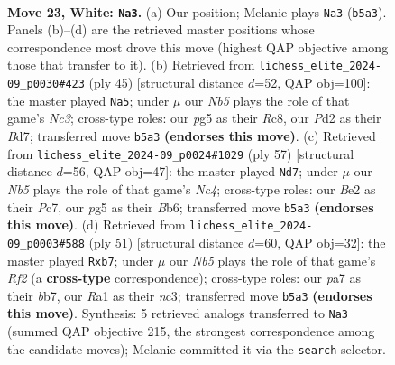 \documentclass[11pt]{article}
\begin{document}
\clearpage

\begin{figure}[p]\centering
\begin{subfigure}{0.46\textwidth}\centering
\resizebox{\linewidth}{!}{%
\newchessgame
\chessboard[
  setfen={r1b3k1/p1pp4/1p5p/1N3pp1/1n6/1P3PP1/P1PPBK1P/R7 w - - 4 23},
  showmover=false,
  pgfstyle=straightmove, color=movearrow, markmove={b5-a3}
]}
\caption{}
\end{subfigure}\hfill
\begin{subfigure}{0.46\textwidth}\centering
\resizebox{\linewidth}{!}{%
\newchessgame
\chessboard[
  setfen={2r3k1/3b1ppp/p1n1p3/1p1pP3/3P1P2/P1N1K3/1P2B1PP/5R2 b - - 1 23},
  showmover=false,
  pgfstyle=straightmove, color=movearrow, markmove={c6-a5}
]}
\caption{}
\end{subfigure}
\\[4pt]
\begin{subfigure}{0.46\textwidth}\centering
\resizebox{\linewidth}{!}{%
\newchessgame
\chessboard[
  setfen={2k5/1pp2Npp/1b3p2/pPn5/P7/2P3P1/r4P1P/3RBK2 b - - 1 29},
  showmover=false,
  pgfstyle=straightmove, color=movearrow, markmove={c5-d7}
]}
\caption{}
\end{subfigure}\hfill
\begin{subfigure}{0.46\textwidth}\centering
\resizebox{\linewidth}{!}{%
\newchessgame
\chessboard[
  setfen={6k1/pB3r1p/1p2pp2/2p5/2Pn1P2/1PN1R1P1/P6P/5K2 b - - 0 26},
  showmover=false,
  pgfstyle=straightmove, color=movearrow, markmove={f7-b7}
]}
\caption{}
\end{subfigure}
\caption{\textbf{Move 23, White: \texttt{Na3}.} (a) Our position; Melanie plays \texttt{Na3} (\texttt{b5a3}). Panels (b)--(d) are the retrieved master positions whose correspondence most drove this move (highest QAP objective among those that transfer to it). (b) Retrieved from \texttt{lichess\_elite\_2024-09\_p0030\#423} (ply 45) [structural distance $d$=52, QAP obj=100]: the master played \texttt{Na5}; under $\mu$ our \emph{Nb5} plays the role of that game's \emph{Nc3}; cross-type roles: our \emph{p}g5 as their \emph{R}c8, our \emph{P}d2 as their \emph{B}d7; transferred move \texttt{b5a3} \textbf{(endorses this move)}. (c) Retrieved from \texttt{lichess\_elite\_2024-09\_p0024\#1029} (ply 57) [structural distance $d$=56, QAP obj=47]: the master played \texttt{Nd7}; under $\mu$ our \emph{Nb5} plays the role of that game's \emph{Nc4}; cross-type roles: our \emph{B}e2 as their \emph{P}c7, our \emph{p}g5 as their \emph{B}b6; transferred move \texttt{b5a3} \textbf{(endorses this move)}. (d) Retrieved from \texttt{lichess\_elite\_2024-09\_p0003\#588} (ply 51) [structural distance $d$=60, QAP obj=32]: the master played \texttt{Rxb7}; under $\mu$ our \emph{Nb5} plays the role of that game's \emph{Rf2} (a \textbf{cross-type} correspondence); cross-type roles: our \emph{p}a7 as their \emph{b}b7, our \emph{R}a1 as their \emph{n}c3; transferred move \texttt{b5a3} \textbf{(endorses this move)}. Synthesis: 5 retrieved analogs transferred to \texttt{Na3} (summed QAP objective 215, the strongest correspondence among the candidate moves); Melanie committed it via the \texttt{search} selector.}
\label{fig:thought-m44}
\end{figure}
\end{document}
